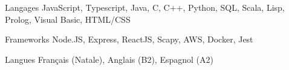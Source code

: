
\begin{cvskills}
  \cvskill
    {Langages} %
    {JavaScript, Typescript, Java, C, C++, Python, SQL, Scala, Lisp, Prolog, Visual Basic, HTML/CSS} %

  \cvskill
    {Frameworks} %
    {Node.JS, Express, ReactJS, Scapy, AWS, Docker, Jest} %
    
  \cvskill
    {Langues} %
    {Français (Natale), Anglais (B2), Espagnol (A2)} %
\end{cvskills}
